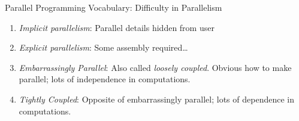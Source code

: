 







\begin{frame}
  \begin{block}{Parallel Programming Vocabulary:  Difficulty in Parallelism}
  \begin{enumerate}[<+-|alert@+>]
    \item \emph{Implicit parallelism}:  Parallel details hidden from user
    \item \emph{Explicit parallelism}:  Some assembly required\dots
    \item \emph{Embarrassingly Parallel}:  Also called \emph{loosely coupled}.  
Obvious how to make parallel; lots of independence in computations.
    \item \emph{Tightly Coupled}:  Opposite of embarrassingly parallel; lots of 
dependence in computations.
  \end{enumerate}  
  \end{block}
\end{frame}


